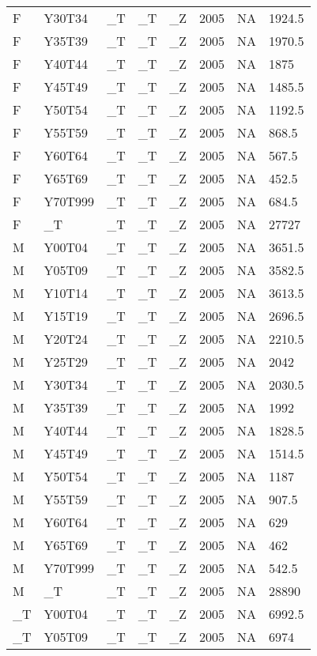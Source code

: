 \begin{longtable}[t]{llllllll}
F & Y30T34 & \_T & \_T & \_Z & 2005 & NA & 1924.5\\
\addlinespace
F & Y35T39 & \_T & \_T & \_Z & 2005 & NA & 1970.5\\
F & Y40T44 & \_T & \_T & \_Z & 2005 & NA & 1875\\
F & Y45T49 & \_T & \_T & \_Z & 2005 & NA & 1485.5\\
F & Y50T54 & \_T & \_T & \_Z & 2005 & NA & 1192.5\\
F & Y55T59 & \_T & \_T & \_Z & 2005 & NA & 868.5\\
\addlinespace
F & Y60T64 & \_T & \_T & \_Z & 2005 & NA & 567.5\\
F & Y65T69 & \_T & \_T & \_Z & 2005 & NA & 452.5\\
F & Y70T999 & \_T & \_T & \_Z & 2005 & NA & 684.5\\
F & \_T & \_T & \_T & \_Z & 2005 & NA & 27727\\
M & Y00T04 & \_T & \_T & \_Z & 2005 & NA & 3651.5\\
\addlinespace
M & Y05T09 & \_T & \_T & \_Z & 2005 & NA & 3582.5\\
M & Y10T14 & \_T & \_T & \_Z & 2005 & NA & 3613.5\\
M & Y15T19 & \_T & \_T & \_Z & 2005 & NA & 2696.5\\
M & Y20T24 & \_T & \_T & \_Z & 2005 & NA & 2210.5\\
M & Y25T29 & \_T & \_T & \_Z & 2005 & NA & 2042\\
\addlinespace
M & Y30T34 & \_T & \_T & \_Z & 2005 & NA & 2030.5\\
M & Y35T39 & \_T & \_T & \_Z & 2005 & NA & 1992\\
M & Y40T44 & \_T & \_T & \_Z & 2005 & NA & 1828.5\\
M & Y45T49 & \_T & \_T & \_Z & 2005 & NA & 1514.5\\
M & Y50T54 & \_T & \_T & \_Z & 2005 & NA & 1187\\
\addlinespace
M & Y55T59 & \_T & \_T & \_Z & 2005 & NA & 907.5\\
M & Y60T64 & \_T & \_T & \_Z & 2005 & NA & 629\\
M & Y65T69 & \_T & \_T & \_Z & 2005 & NA & 462\\
M & Y70T999 & \_T & \_T & \_Z & 2005 & NA & 542.5\\
M & \_T & \_T & \_T & \_Z & 2005 & NA & 28890\\
\addlinespace
\_T & Y00T04 & \_T & \_T & \_Z & 2005 & NA & 6992.5\\
\_T & Y05T09 & \_T & \_T & \_Z & 2005 & NA & 6974\\

\end{longtable}
